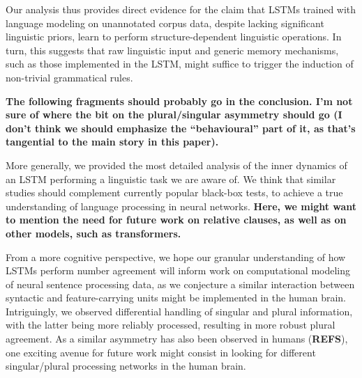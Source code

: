 Our analysis thus provides direct evidence for the claim that LSTMs
trained with language modeling on unannotated corpus data, despite
lacking significant linguistic priors, learn to perform
structure-dependent linguistic operations. In turn, this suggests that
raw linguistic input and generic memory mechanisms, such as those
implemented in the LSTM, might suffice to trigger the induction of
non-trivial grammatical rules.

\textbf{The following fragments should probably go in the
  conclusion. I'm not sure of where the bit on the plural/singular
  asymmetry should go (I don't think we should emphasize the
  ``behavioural'' part of it, as that's tangential to the main story in
  this paper).}

More generally, we provided the most detailed analysis of the inner
dynamics of an LSTM performing a linguistic task we are aware of. We
think that similar studies should complement currently popular
black-box tests, to achieve a true understanding of language
processing in neural networks. \textbf{Here, we might want to mention
  the need for future work on relative clauses, as well as on other
  models, such as transformers.}

From a more cognitive perspective, we hope our granular
understanding of how LSTMs perform number agreement will inform work
on computational modeling of neural sentence processing data, as we
conjecture a similar interaction between syntactic and
feature-carrying units might be implemented in the human
brain. Intriguingly, we observed differential handling of singular and
plural information, with the latter being more reliably processed,
resulting in more robust plural agreement. As a similar asymmetry has
also been observed in humans (\textbf{REFS}), one exciting avenue for
future work might consist in looking for different singular/plural
processing networks in the human brain.
